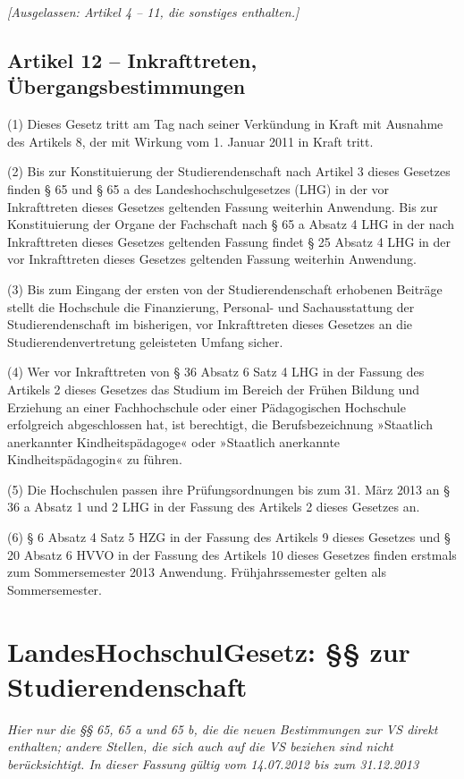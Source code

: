 \documentclass[
10pt,
a4paper,
twoside,								%
titlepage=false,							%
draft=false								%
]{scrartcl}
\begin{document}
\bigskip
\emph{[Ausgelassen: Artikel 4 – 11, die sonstiges enthalten.]}


\subsection{Artikel 12 – Inkrafttreten, Übergangsbestimmungen}

(1) Dieses Gesetz tritt am Tag nach seiner Verkündung in Kraft mit Ausnahme des Artikels 8, der mit Wirkung vom 1. Januar 2011 in Kraft tritt.

(2) Bis zur Konstituierung der Studierendenschaft nach Artikel 3 dieses Gesetzes finden § 65 und § 65 a des Landeshochschulgesetzes (LHG) in der vor Inkrafttreten dieses Gesetzes geltenden Fassung weiterhin Anwendung. Bis zur Konstituierung der Organe der Fachschaft nach § 65 a Absatz 4 LHG in der nach Inkrafttreten dieses Gesetzes geltenden Fassung findet § 25 Absatz 4 LHG in der vor Inkrafttreten dieses Gesetzes geltenden Fassung weiterhin Anwendung. 

(3) Bis zum Eingang der ersten von der Studierendenschaft erhobenen Beiträge stellt die Hochschule die Finanzierung, Personal- und Sachausstattung der Studierendenschaft im bisherigen, vor Inkrafttreten dieses Gesetzes an die Studierendenvertretung geleisteten Umfang sicher.

(4) Wer vor Inkrafttreten von § 36 Absatz 6 Satz 4 LHG in der Fassung des Artikels 2 dieses Gesetzes das Studium im Bereich der Frühen Bildung und Erziehung an einer Fachhochschule oder einer Pädagogischen Hochschule erfolgreich abgeschlossen hat, ist berechtigt, die Berufsbezeichnung »Staatlich anerkannter Kindheitspädagoge« oder »Staatlich anerkannte Kindheitspädagogin« zu führen.

(5) Die Hochschulen passen ihre Prüfungsordnungen bis zum 31. März 2013 an § 36 a Absatz 1 und 2 LHG in der Fassung des Artikels 2 dieses Gesetzes an.

(6) § 6 Absatz 4 Satz 5 HZG in der Fassung des Artikels 9 dieses Gesetzes und § 20 Absatz 6 HVVO in der Fassung des Artikels 10 dieses Gesetzes finden erstmals zum Sommersemester 2013 Anwendung. Frühjahrssemester gelten als Sommersemester.




\newpage
\section{LandesHochschulGesetz: §§ zur Studierendenschaft}

\emph{Hier nur die §§ 65, 65 a und 65 b, die die neuen Bestimmungen zur VS direkt enthalten; andere Stellen, die sich auch auf die VS beziehen sind nicht berücksichtigt. In dieser Fassung gültig vom 14.07.2012 bis zum 31.12.2013}
\end{document}
